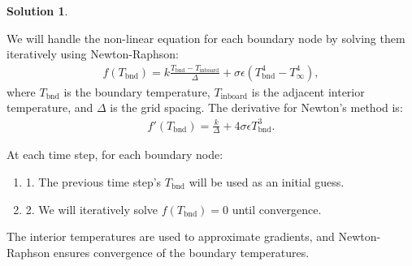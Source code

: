 \documentclass[12pt]{article}
\theoremstyle{definition} %
\newtheorem{solution}{Solution}
\theoremstyle{plain} %
\begin{document}
\begin{solution}
\begin{enumerate}
        We will handle the non-linear equation for each boundary node by solving them iteratively using Newton-Raphson:
        \begin{align}
        f(T_\text{bnd}) = k \frac{T_\text{bnd} - T_\text{inboard}}{\Delta} + \sigma \epsilon \left( T_\text{bnd}^4 - T_\infty^4 \right)\label{eqn16}, 
        \end{align}
        where $T_\text{bnd}$ is the boundary temperature, $T_\text{inboard}$ is the adjacent interior temperature, and $\Delta$ is the grid spacing. The derivative for Newton's method is:
        \begin{align}
        f'(T_\text{bnd}) = \frac{k}{\Delta} + 4 \sigma \epsilon T_\text{bnd}^3.
        \end{align}
        
        At each time step, for each boundary node:
    \begin{enumerate}
        \item 
        1. The previous time step's $T_\text{bnd}$ will be used as an initial guess.
    \item 
        2. We will iteratively solve $f(T_\text{bnd}) = 0$ until convergence.
    \end{enumerate}
        
        
    The interior temperatures are used to approximate gradients, and Newton-Raphson ensures convergence of the boundary temperatures.
    \end{enumerate}
\end{solution}
\end{document}
